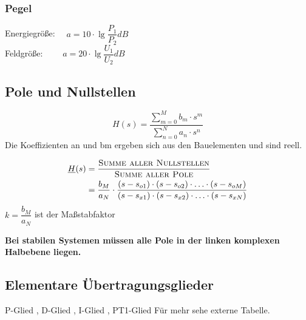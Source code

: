 \subsubsection{Pegel}
    \begin{mdframed}[style=exercise]
        Energiegröße: $\quad a = 10\cdot \lg\dfrac{P_1}{P_2}dB $\\
        Feldgröße: $\qquad a = 20\cdot \lg\dfrac{U_1}{U_2}dB $
    \end{mdframed}

\subsection{Pole und Nullstellen}
\[
    H(s)=\frac{\sum_{m=0}^{M} b_{m} \cdot s^{m}}{\sum_{n=0}^{N} a_{n} \cdot s^{n}}
\]
Die Koeffizienten an und bm ergeben sich aus den Bauelementen und sind reell.
\begin{mdframed}[style=exercise]
    \begin{align*}
        \underline{H}(s) &= \frac{\textsc{Summe aller Nullstellen}}{\textsc{Summe aller Pole}}\\
        &=\frac{b_{M}}{a_{N}} \cdot \frac{\left(s-s_{o 1}\right) \cdot\left(s-s_{o
        2}\right) \cdot \ldots \cdot\left(s-s_{o M}\right)}{\left(s-s_{x 1}\right)
        \cdot\left(s-s_{x 2}\right) \cdot \ldots \cdot\left(s-s_{x N}\right)}
    \end{align*}
    $k=\dfrac{b_M}{a_N}$ ist der Maßstabfaktor
\end{mdframed}
\textbf{Bei stabilen Systemen müssen alle Pole in der linken komplexen Halbebene liegen.}

\newpage
\subsection{Elementare Übertragungsglieder}
\footnotesize
    P-Glied , D-Glied , I-Glied , PT1-Glied
\normalsize
Für mehr sehe externe Tabelle.


